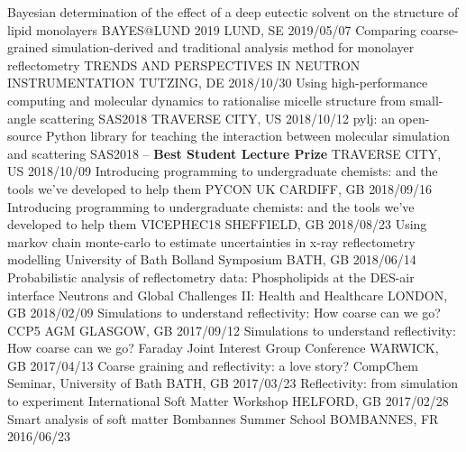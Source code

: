 \begin{cvhonors}
  \cvhonor
    {Bayesian determination of the effect of a deep eutectic solvent on the structure of lipid monolayers}
    {BAYES@LUND 2019}
    {LUND, SE}
    {2019/05/07}
  \cvhonor
    {Comparing coarse-grained simulation-derived and traditional analysis method for monolayer reflectometry}
    {TRENDS AND PERSPECTIVES IN NEUTRON INSTRUMENTATION}
    {TUTZING, DE}
    {2018/10/30}
  \cvhonor
    {Using high-performance computing and molecular dynamics to rationalise micelle structure from small-angle scattering}
    {SAS2018}
    {TRAVERSE CITY, US}
    {2018/10/12}
  \cvhonor
    {pylj: an open-source Python library for teaching the interaction between molecular simulation and scattering}
	{SAS2018 -- \textbf{Best Student Lecture Prize}}
    {TRAVERSE CITY, US}
    {2018/10/09}
  \cvhonor
    {Introducing programming to undergraduate chemists: and the tools we've developed to help them}
    {PYCON UK}
    {CARDIFF, GB}
    {2018/09/16}
  \cvhonor
    {Introducing programming to undergraduate chemists: and the tools we've developed to help them}
    {VICEPHEC18}
    {SHEFFIELD, GB}
    {2018/08/23}
  \cvhonor
    {Using markov chain monte-carlo to estimate uncertainties in x-ray reflectometry modelling}
    {University of Bath Bolland Symposium}
    {BATH, GB}
    {2018/06/14}
  \cvhonor
    {Probabilistic analysis of reflectometry data: Phospholipids at the DES-air interface}
    {Neutrons and Global Challenges II: Health and Healthcare}
    {LONDON, GB}
    {2018/02/09}
  \cvhonor
    {Simulations to understand reflectivity: How coarse can we go?}
    {CCP5 AGM}
    {GLASGOW, GB}
    {2017/09/12}
  \cvhonor
    {Simulations to understand reflectivity: How coarse can we go?}
    {Faraday Joint Interest Group Conference}
    {WARWICK, GB}
    {2017/04/13}
  \cvhonor
    {Coarse graining and reflectivity: a love story?}
    {CompChem Seminar, University of Bath}
    {BATH, GB}
    {2017/03/23}
  \cvhonor
    {Reflectivity: from simulation to experiment}
    {International Soft Matter Workshop}
    {HELFORD, GB}
    {2017/02/28}
  \cvhonor
    {Smart analysis of soft matter}
    {Bombannes Summer School}
    {BOMBANNES, FR}
    {2016/06/23}
\end{cvhonors}
